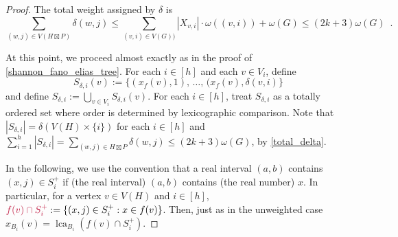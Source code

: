 \documentclass{patmorin}
\makeatletter
\renewcommand{\le}{\leqslant}
\def\mathcolor#1#{\@mathcolor{#1}}
\def\@mathcolor#1#2#3{%
  \protect\leavevmode
  \begingroup
    \color#1{#2}#3%
  \endgroup
}
\newcommand{\mathdefin}[1]{\mathcolor{brightmaroon}{#1}}
\DeclareMathOperator{\lca}{lca}
\makeatother
\begin{document}
\begin{proof}
    The total weight assigned by $\delta$ is
    \begin{equation}
      \sum_{(w,j)\in V(H\boxtimes P)} \delta(w,j)
      \le \sum_{(v,i)\in V(G))}|X_{v,i}|\cdot\omega((v,i)) + \omega(G)
      \le (2k+3)\omega(G) \enspace .
      \label{total_delta}
    \end{equation}

    At this point, we proceed almost exactly as in the proof of \cref{shannon_fano_elias_tree}.
    For each $i\in[h]$ and each $v\in V_i$, define
    \[
      S_{\delta,i}(v):=\{(x_f(v),1),\,\ldots,\, (x_f(v),\delta(v,i)\}
    \]
    and define $S_{\delta,i}:=\bigcup_{v\in V_i}S_{\delta,i}(v)$.  For each $i\in[h]$, treat $S_{\delta,i}$ as a totally ordered set where order is determined by lexicographic comparison.  Note that $|S_{\delta,i}|=\delta(V(H)\times\{i\})$ for each $i\in[h]$ and $\sum_{i=1}^h |S_{\delta,i}|=\sum_{(w,j)\in H\boxtimes P}\delta(w,j)\le (2k+3)\omega(G)$, by \cref{total_delta}.

    In the following, we use the convention that a real interval $(a,b)$ contains $(x,j)\in S^+_i$ if (the real interval) $(a,b)$ contains (the real number) $x$. In particular, for a vertex $v\in V(H)$ and $i\in[h]$, $\mathdefin{f(v)\cap S^+_i}:=\{(x,j)\in S^+_i:x\in f(v)\}$. Then, just as in the unweighted case $x_{B_i}(v)=\lca_{B_i}(f(v)\cap S^+_i)$.


\end{proof}
\end{document}
